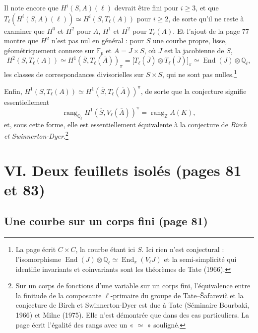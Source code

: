 \documentclass[11pt,a4paper]{article}
\begin{document}
Il note encore que $H^{i}(S, A)(\ell)$ devrait être fini pour $i \geqslant 3$, et
que $T_{\ell}(H^{i}(S, A)(\ell)) \simeq H^{i}(S, T_{\ell}(A))$ pour $i \geqslant 2$,
de sorte qu'il ne reste à examiner que $H^{0}$ et $H^{2}$ pour $A$, $H^{1}$ et
$H^{2}$ pour $T_{\ell}(A)$. Et l'ajout de la page 77 montre que $H^{2}$ n'est pas
nul en général : pour $S$ une courbe propre, lisse, géométriquement connexe sur
$\mathbb{F}_{p}$ et $A = J \times S$, où $J$ est la jacobienne de $S$,
\[
H^{2}(S, T_{\ell}(A)) \simeq H^{1}(\overline{S}, T_{\ell}(\overline{A}))_{\pi}
= \bigl[T_{\ell}(\overline{J}) \otimes T_{\ell}(\overline{J})\bigr]_{\pi}
\simeq \operatorname{End}(J) \otimes \mathbb{Q}_{\ell} ,
\]
les classes de correspondances divisorielles sur $S \times S$, qui ne sont pas
nulles.\footnote{La page écrit $C \times C$, la courbe étant ici $S$. Ici rien n'est conjectural : l'isomorphisme
$\operatorname{End}(J) \otimes \mathbb{Q}_{\ell} \simeq
\operatorname{End}_{\pi}(V_{\ell}J)$ et la semi-simplicité qui identifie invariants
et coinvariants sont les théorèmes de Tate (1966).}

Enfin, $H^{1}(S, T_{\ell}(A)) \simeq H^{1}(\overline{S}, T_{\ell}(\overline{A}))^{\pi}$,
de sorte que la conjecture signifie essentiellement
\[
\operatorname{rang}_{\mathbb{Q}_{\ell}} H^{1}(\overline{S}, V_{\ell}(\overline{A}))^{\pi}
= \operatorname{rang}_{\mathbb{Z}} A(K) ,
\]
et, sous cette forme, elle est essentiellement équivalente à la conjecture de
\emph{Birch et Swinnerton-Dyer}.\footnote{Sur un corps de fonctions d'une
variable sur un corps fini, l'équivalence entre la finitude de la composante
$\ell$-primaire du groupe de Tate--Šafarevič et la conjecture de Birch et
Swinnerton-Dyer est due à Tate (Séminaire Bourbaki, 1966) et Milne (1975). Elle
n'est démontrée que dans des cas particuliers. La page écrit l'égalité des rangs
avec un « $\simeq$ » souligné.}

\section*{VI. Deux feuillets isolés (pages 81 et 83)}

\subsection*{Une courbe sur un corps fini (page 81)}
\end{document}
